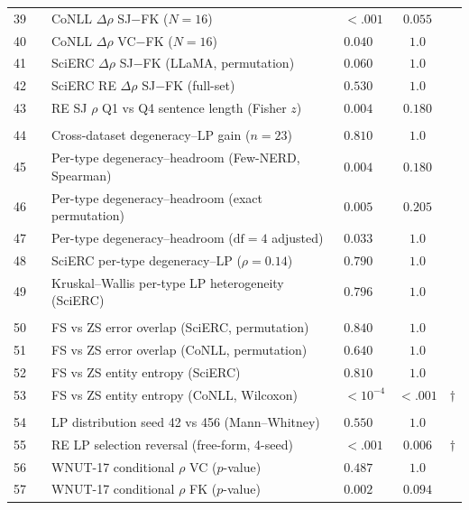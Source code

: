 \begin{table}[t]
\begin{tabular}{clllcc}
39 & & CoNLL $\Delta\rho$ SJ$-$FK ($N{=}16$) & ${<}.001$ & $0.055$ & \\
40 & & CoNLL $\Delta\rho$ VC$-$FK ($N{=}16$) & $0.040$ & $1.0$ &  \\
41 & & SciERC $\Delta\rho$ SJ$-$FK (LLaMA, permutation) & $0.060$ & $1.0$ &  \\
42 & & SciERC RE $\Delta\rho$ SJ$-$FK (full-set) & $0.530$ & $1.0$ &  \\
43 & & RE SJ $\rho$ Q1 vs Q4 sentence length (Fisher $z$) & $0.004$ & $0.180$ &  \\
\addlinespace
\multicolumn{6}{l}{\textit{Correlation}} \\
44 & & Cross-dataset degeneracy--LP gain ($n{=}23$) & $0.810$ & $1.0$ &  \\
45 & & Per-type degeneracy--headroom (Few-NERD, Spearman) & $0.004$ & $0.180$ &  \\
46 & & Per-type degeneracy--headroom (exact permutation) & $0.005$ & $0.205$ &  \\
47 & & Per-type degeneracy--headroom ($\text{df}{=}4$ adjusted) & $0.033$ & $1.0$ &  \\
48 & & SciERC per-type degeneracy--LP ($\rho{=}0.14$) & $0.790$ & $1.0$ &  \\
49 & & Kruskal--Wallis per-type LP heterogeneity (SciERC) & $0.796$ & $1.0$ &  \\
\addlinespace
\multicolumn{6}{l}{\textit{FS error}} \\
50 & & FS vs ZS error overlap (SciERC, permutation) & $0.840$ & $1.0$ &  \\
51 & & FS vs ZS error overlap (CoNLL, permutation) & $0.640$ & $1.0$ &  \\
52 & & FS vs ZS entity entropy (SciERC) & $0.810$ & $1.0$ &  \\
53 & & FS vs ZS entity entropy (CoNLL, Wilcoxon) & ${<}10^{-4}$ & ${<}.001$ & $\dagger$ \\
\addlinespace
\multicolumn{6}{l}{\textit{Other}} \\
54 & & LP distribution seed 42 vs 456 (Mann--Whitney) & $0.550$ & $1.0$ &  \\
55 & & RE LP selection reversal (free-form, 4-seed) & ${<}.001$ & $0.006$ & $\dagger$ \\
56 & & WNUT-17 conditional $\rho$ VC ($p$-value) & $0.487$ & $1.0$ &  \\
57 & & WNUT-17 conditional $\rho$ FK ($p$-value) & $0.002$ & $0.094$ &  \\
\bottomrule
\end{tabular}
\end{table}

